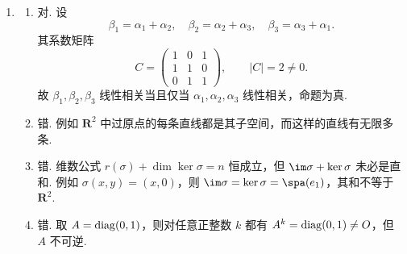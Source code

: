 \begin{enumerate}
\begin{enumerate}
        \item 取
        \[
            \delta_1=-\alpha_1+2\alpha_2+3\alpha_3,\quad
            \delta_2=\alpha_1,\quad
            \delta_3=\alpha_2.
        \]
        则 $\{\delta_1,\delta_2,\delta_3\}$ 为 $V$ 的一组基，且 $\sigma$ 在该基下的矩阵为
        \[
            \begin{pmatrix}
                0&1&0\\
                0&2&2\\
                0&0&1
            \end{pmatrix}.
        \]
    \end{enumerate}

    \item
    \begin{enumerate}
        \item 对. 设
        \[
            \beta_1=\alpha_1+\alpha_2,\quad
            \beta_2=\alpha_2+\alpha_3,\quad
            \beta_3=\alpha_3+\alpha_1.
        \]
        其系数矩阵
        \[
            C=\begin{pmatrix}
                1&0&1\\
                1&1&0\\
                0&1&1
            \end{pmatrix},\qquad |C|=2\neq 0.
        \]
        故 $\beta_1,\beta_2,\beta_3$ 线性相关当且仅当 $\alpha_1,\alpha_2,\alpha_3$ 线性相关，命题为真.

        \item 错. 例如 $\mathbf{R}^2$ 中过原点的每条直线都是其子空间，而这样的直线有无限多条.

        \item 错. 维数公式 $r(\sigma)+\dim\ker\sigma=n$ 恒成立，但 $\im\sigma+\ker\sigma$ 未必是直和. 例如 $\sigma(x,y)=(x,0)$，则 $\im\sigma=\ker\sigma=\spa(e_1)$，其和不等于 $\mathbf{R}^2$.

        \item 错. 取 $A=\operatorname{diag}(0,1)$，则对任意正整数 $k$ 都有 $A^k=\operatorname{diag}(0,1)\neq O$，但 $A$ 不可逆.
    \end{enumerate}
\end{enumerate}

\clearpage
